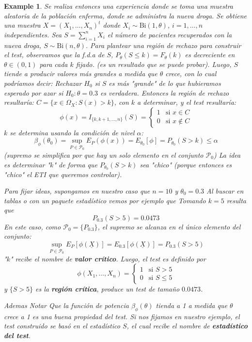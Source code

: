 \documentclass{article}
\theoremstyle{remarkstyle}
\theoremstyle{examplestyle}
\newtheorem*{example}{Example}
\theoremstyle{definitionstyle}
\theoremstyle{lemmastyle}
\theoremstyle{theoremstyle}
\begin{document}
\begin{example}
Se realiza entonces una experiencia donde se toma una muestra aleatoria de la población enferma, donde se administra la nueva droga. Se obtiene una muestra $X=(X_1, \dots, X_n)^t$ donde $X_i \sim \text{Bi}(1, \theta)$, $i=1, \dots, n$ independientes. Sea $S = \sum_{i=1}^n X_i$ el número de pacientes recuperados con la nueva droga, $S \sim \text{Bi}(n, \theta)$. 
Para plantear una región de rechazo para construir el test, observamos que la f.d.a de $S$, $P_\theta(S \le k) = F_\theta(k)$ es decreciente en $\theta \in (0,1)$ para cada $k$ fijado. (es un resultado que se puede probar).
Luego, $S$ tiende a producir valores más grandes a medida que $\theta$ crece, con lo cual podríamos decir: Rechazar $H_0$ si $S$ es más "grande" de lo que hubieramos esperado por azar si $H_0: \theta=0.3$ es verdadera. Entonces la región de rechazo resultaría: $C = \{x\in \Omega_{X}: S(x) > k\}$, con $k$ a determinar, y el test resultaría:
\[ \phi(x) = I_{\{k, k+1, \dots, n\}}(S)= \begin{cases} 1 & \text{si } x \in C \\ 0 & \text{si } x \notin C \end{cases} \]
$k$ se determina usando la condición de nivel $\alpha$:
\[ \beta_\phi(\theta_0) =\sup_{P\in \mathcal{P}_{0}}E_{P}(\phi(x))= E_{\theta_0}[\phi] = P_{\theta_0}(S > k) \le \alpha \]
(supremo se simplifica por que hay un solo elemento en el conjunto $\mathcal{P}_{0}$) 
La idea es determinar "$k$" de forma que $P_{\theta_0}(S > k)$ sea "chico" (porque entonces es "chico" el ETI que queremos controlar).

Para fijar ideas, supongamos en nuestro caso que $n=10$ y $\theta_0=0.3$
Al buscar en tablas o con un paquete estadístico vemos por ejemplo que
Tomando $k=5$ resulta que
\[ P_{0.3}(S > 5) = 0.0473 \]
En este caso, como $\mathcal{P}_0 = \{P_{0.3}\}$, el supremo se alcanza en el único elemento del conjunto:
\[ \sup_{P \in \mathcal{P}_0} E_P[\phi(\underline{X})] = E_{0.3}[\phi(\underline{X})] = P_{0.3}(S > 5) \]
"$k$" recibe el nombre de \textbf{valor crítico}. Luego, el test es definido por
\[ \phi(X_1, \dots, X_n) = \begin{cases} 1 & \text{si } S > 5 \\ 0 & \text{si } S \le 5 \end{cases} \]
y $\{S > 5\}$ es la \textbf{región crítica}, produce un test de tamaño $0.0473$.

Ademas Notar
Que la función de potencia $\beta_\phi(\theta)$ tienda a 1 a medida que $\theta$ crece a 1 es una buena propiedad del test.
Si nos fijamos en nuestro ejemplo, el test construido se basó en el estadístico $S$, el cual recibe el nombre de \textbf{estadístico del test}.
\end{example}
\end{document}
